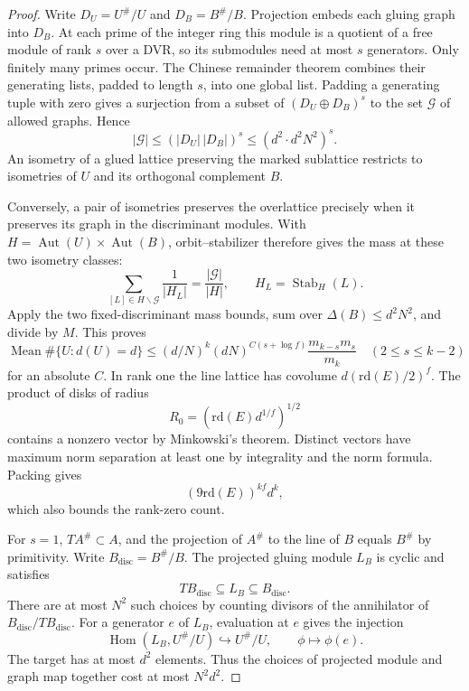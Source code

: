 \begin{proof}
Write \(D_U=U^\#/U\) and \(D_B=B^\#/B\). Projection embeds each gluing graph into \(D_B\). At each prime of the integer ring this module is a quotient of a free module of rank \(s\) over a DVR, so its submodules need at most \(s\) generators. Only finitely many primes occur. The Chinese remainder theorem combines their generating lists, padded to length \(s\), into one global list. Padding a generating tuple with zero gives a surjection from a subset of \((D_U\oplus D_B)^s\) to the set \(\mathcal G\) of allowed graphs. Hence
\[
 |\mathcal G|\le(|D_U|\,|D_B|)^s
               \le(d^2\cdot d^2N^2)^s.
\]
An isometry of a glued lattice preserving the marked sublattice restricts to isometries of \(U\) and its orthogonal complement \(B\).

Conversely, a pair of isometries preserves the overlattice precisely when it preserves its graph in the discriminant modules. With \(H=\operatorname{Aut}(U)\times\operatorname{Aut}(B)\), orbit--stabilizer therefore gives the mass at these two isometry classes:
\[
       \sum_{[L]\in H\backslash\mathcal G}\frac1{|H_L|}
           =\frac{|\mathcal G|}{|H|},\qquad H_L=\operatorname{Stab}_H(L).
\]
Apply the two fixed-discriminant mass bounds, sum over
\(\Delta(B)\leq d^2N^2\), and divide by \(M\). This proves
\[
 \operatorname{Mean}\#\{U:d(U)=d\}\leq
 (d/N)^k(dN)^{C(s+\log f)}\frac{m_{k-s}m_s}{m_k}
 \quad(2\leq s\leq k-2)
\]
for an absolute \(C\). In rank one the line lattice
has covolume \(d(\mathrm{rd}(E)/2)^f\).
The product of disks of radius
\[
 R_0=(\mathrm{rd}(E)d^{1/f})^{1/2}
\]
contains a nonzero vector by Minkowski's theorem.
Distinct vectors have
maximum norm separation at least one by integrality and
the norm formula. Packing gives
\[
 (9\mathrm{rd}(E))^{kf}d^k,
\]
which also bounds the rank-zero count.


For \(s=1\), \(T A^\#\subset A\), and the projection of
\(A^\#\) to the line of \(B\) equals \(B^\#\) by primitivity.
Write \(B_{\mathrm{disc}}=B^\#/B\). The projected gluing
module \(L_B\) is cyclic and satisfies
\[
       T B_{\mathrm{disc}}\subseteq L_B\subseteq B_{\mathrm{disc}}.
\]
There are at most \(N^2\) such choices by counting divisors of
the annihilator of \(B_{\mathrm{disc}}/T B_{\mathrm{disc}}\).
For a generator \(e\) of \(L_B\), evaluation at \(e\) gives the injection
\[
  \operatorname{Hom}(L_B,U^\#/U)\hookrightarrow U^\#/U,\qquad
  \phi\longmapsto\phi(e).
\]
The target has at most \(d^2\) elements. Thus the choices of projected
module and graph map together cost at most \(N^2d^2\).


\end{proof}
